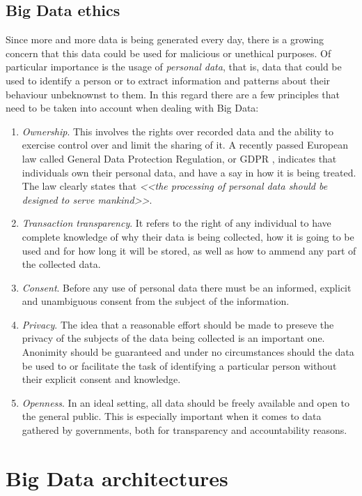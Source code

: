 \subsection{Big Data ethics}

Since more and more data is being generated every day, there is a growing concern that this data could be used for malicious or unethical purposes. Of particular importance is the usage of \textit{personal data}, that is, data that could be used to identify a person or to extract information and patterns about their behaviour unbeknownst to them. In this regard there are a few principles that need to be taken into account when dealing with Big Data:

\begin{enumerate}[1.]
  \item \textit{Ownership}. This involves the rights over recorded data and the ability to exercise control over and limit the sharing of it. A recently passed European law called General Data Protection Regulation, or GDPR \cite{eu2016gdpr}, indicates that individuals own their personal data, and have a say in how it is being treated. The law clearly states that \textit{<<the processing of personal data should be designed to serve mankind>>}.
  \item \textit{Transaction transparency}. It refers to the right of any individual to have complete knowledge of why their data is being collected, how it is going to be used and for how long it will be stored, as well as how to ammend any part of the collected data.
  \item \textit{Consent}. Before any use of personal data there must be an informed, explicit and unambiguous consent from the subject of the information.
  \item \textit{Privacy}. The idea that a reasonable effort should be made to preseve the privacy of the subjects of the data being collected is an important one. Anonimity should be guaranteed and under no circumstances should the data be used to or facilitate the task of identifying a particular person without their explicit consent and knowledge.
  \item \textit{Openness}. In an ideal setting, all data should be freely available and open to the general public. This is especially important when it comes to data gathered by governments, both for transparency and accountability reasons.
\end{enumerate}

\section{Big Data architectures}

